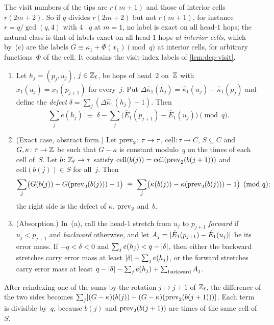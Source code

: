 The visit numbers of the tips are $r(m+1)$ and those of interior cells $r(2m+2)$. So if $q$ divides $r(2m+2)$ but not
$r(m+1)$, for instance $r=q/\gcd(q,4)$ with $4\mid q$ at $m=1$, no label is exact on all head-$1$ hops; the natural
class is that of labels exact on all head-$1$ hops \emph{at interior cells}, which by~(c) are the labels
$G\equiv\kappa_1+\Phi(x_1)\pmod q$ at interior cells, for arbitrary functions~$\Phi$ of the cell. It contains the
visit-index labels of \cref{lem:dep-visit}.

\begin{lemma}\label{lem:transfer}
\begin{enumerate}[label=(\alph*)]
\item Let $h_j=(p_j,u_j)$, $j\in\mathbb{Z}_\ell$, be hops of head~$2$ on~$\mathbb{Z}$ with $x_1(u_j)=x_1(p_{j+1})$ for every~$j$. Put
$\Delta\hat\kappa_1(h_j)=\hat\kappa_1(u_j)-\hat\kappa_1(p_j)$ and define the \emph{defect}
$\delta=\sum_j(\Delta\hat\kappa_1(h_j)-1)$. Then
\[
  \sum_je(h_j)\;\equiv\;\delta-\sum_j\bigl(\hat E_1(p_{j+1})-\hat E_1(u_j)\bigr)\pmod q.
\]
\item (Exact case, abstract form.) Let $\mathrm{prev}_2\colon\tau\to\tau$, $\mathrm{cell}\colon\tau\to C$, $S\subseteq C$ and
$G,\kappa\colon\tau\to\mathbb{Z}$ be such that $G-\kappa$ is constant modulo~$q$ on the times of each cell of~$S$. Let
$b\colon\mathbb{Z}_\ell\to\tau$ satisfy $\mathrm{cell}(b(j))=\mathrm{cell}(\mathrm{prev}_2(b(j+1)))$ and $\mathrm{cell}(b(j))\in S$ for
all~$j$. Then
\[
  \sum_j\bigl(G(b(j))-G(\mathrm{prev}_2(b(j)))-1\bigr)\;\equiv\;\sum_j\bigl(\kappa(b(j))-\kappa(\mathrm{prev}_2(b(j)))-1\bigr)
  \pmod q;
\]
the right side is the defect  of $\kappa$, $\mathrm{prev}_2$ and~$b$.
\item (Absorption.) In~(a), call the head-$1$ stretch from $u_j$ to $p_{j+1}$ \emph{forward} if $u_j<p_{j+1}$ and
\emph{backward} otherwise, and let $A_j=\lvert \hat E_1(p_{j+1})-\hat E_1(u_j) \rvert$ be its error mass. If $-q<\delta<0$ and
$\sum_je(h_j)<q-\lvert \delta \rvert$, then either the backward stretches carry error mass at least
$\lvert \delta \rvert+\sum_je(h_j)$, or the forward stretches carry error mass at least
$q-\lvert \delta \rvert-\sum_je(h_j)+\sum_{\text{backward}}A_j$.
\end{enumerate}
\end{lemma}

\begin{outline}
After reindexing one of the sums by the rotation $j\mapsto j+1$ of $\mathbb{Z}_\ell$, the difference of the
two sides becomes $\sum_j[(G-\kappa)(b(j))-(G-\kappa)(\mathrm{prev}_2(b(j+1)))]$. Each term is divisible by~$q$, because
$b(j)$ and $\mathrm{prev}_2(b(j+1))$ are times of the same cell of~$S$.
\end{outline}

